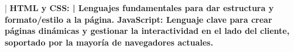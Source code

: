 
|
  \textbf{HTML y CSS: |
  Lenguajes fundamentales para dar estructura y formato/estilo a la página.
  \textbf{JavaScript:
} Lenguaje clave para crear páginas dinámicas y gestionar la interactividad en el lado del cliente, soportado por la mayoría de navegadores actuales.
}
